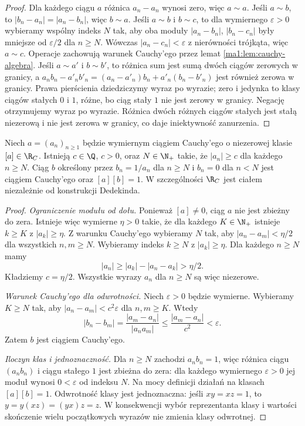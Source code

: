 \begin{proof}
Dla każdego ciągu $a$ różnica $a_n-a_n$ wynosi zero, więc $a\sim a$. Jeśli $a\sim b$, to $|b_n-a_n|=|a_n-b_n|$, więc $b\sim a$. Jeśli $a\sim b$ i $b\sim c$, to dla wymiernego $\varepsilon>0$ wybieramy wspólny indeks $N$ tak, aby oba moduły $|a_n-b_n|$, $|b_n-c_n|$ były mniejsze od $\varepsilon/2$ dla $n\ge N$. Wówczas $|a_n-c_n|<\varepsilon$ z nierówności trójkąta, więc $a\sim c$. Operacje zachowują warunek Cauchy'ego przez lemat \ref{ma1:lem:cauchy-algebra}. Jeśli $a\sim a'$ i $b\sim b'$, to różnica sum jest sumą dwóch ciągów zerowych w granicy, a
$a_nb_n-a'_nb'_n=(a_n-a'_n)b_n+a'_n(b_n-b'_n)$
jest również zerowa w granicy. Prawa pierścienia dziedziczymy wyraz po wyrazie; zero i jedynka to klasy ciągów stałych $0$ i $1$, różne, bo ciąg stały $1$ nie jest zerowy w granicy. Negację otrzymujemy wyraz po wyrazie. Różnica dwóch różnych ciągów stałych jest stałą niezerową i nie jest zerowa w granicy, co daje iniektywność zanurzenia.
\end{proof}

\begin{twierdzenie}
\label{ma1:thm:cauchy-inverse}
Niech $a=(a_n)_{n\ge1}$ będzie wymiernym ciągiem Cauchy'ego o niezerowej klasie $[a]\in\R_C$. Istnieją $c\in\Q$, $c>0$, oraz $N\in\N_+$ takie, że $|a_n|\ge c$ dla każdego $n\ge N$. Ciąg $b$ określony przez $b_n=1/a_n$ dla $n\ge N$ i $b_n=0$ dla $n<N$ jest ciągiem Cauchy'ego oraz $[a][b]=1$. W szczególności $\R_C$ jest ciałem niezależnie od konstrukcji Dedekinda.
\end{twierdzenie}
\begin{proof}
\emph{Ograniczenie modułu od dołu.} Ponieważ $[a]\ne0$, ciąg $a$ nie jest zbieżny do zera. Istnieje więc wymierne $\eta>0$ takie, że dla każdego $K\in\N_+$ istnieje $k\ge K$ z $|a_k|\ge\eta$. Z warunku Cauchy'ego wybieramy $N$ tak, aby $|a_n-a_m|<\eta/2$ dla wszystkich $n,m\ge N$. Wybieramy indeks $k\ge N$ z $|a_k|\ge\eta$. Dla każdego $n\ge N$ mamy
\[
 |a_n|\ge |a_k|-|a_n-a_k|>\eta/2.
\]
Kładziemy $c=\eta/2$. Wszystkie wyrazy $a_n$ dla $n\ge N$ są więc niezerowe.

\emph{Warunek Cauchy'ego dla odwrotności.} Niech $\varepsilon>0$ będzie wymierne. Wybieramy $K\ge N$ tak, aby $|a_n-a_m|<c^2\varepsilon$ dla $n,m\ge K$. Wtedy
\[
 |b_n-b_m|=\frac{|a_m-a_n|}{|a_na_m|}
 \le\frac{|a_m-a_n|}{c^2}<\varepsilon.
\]
Zatem $b$ jest ciągiem Cauchy'ego.

\emph{Iloczyn klas i jednoznaczność.} Dla $n\ge N$ zachodzi $a_nb_n=1$, więc różnica ciągu $(a_nb_n)$ i ciągu stałego $1$ jest zbieżna do zera: dla każdego wymiernego $\varepsilon>0$ jej moduł wynosi $0<\varepsilon$ od indeksu $N$. Na mocy definicji działań na klasach $[a][b]=1$. Odwrotność klasy jest jednoznaczna: jeśli $xy=xz=1$, to $y=y(xz)=(yx)z=z$. W konsekwencji wybór reprezentanta klasy i wartości skończenie wielu początkowych wyrazów nie zmienia klasy odwrotnej.
\end{proof}

